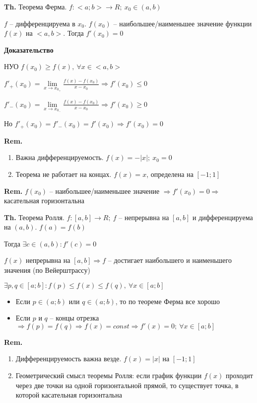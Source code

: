 \documentclass[14pt, letter paper]{article}
\begin{document}
\textbf{Th.} Теорема Ферма. $f : <a;b> \rightarrow R;\ x_0 \in (a, b)$

$f$ -- дифференцируема в $x_0$. $f(x_0)$ -- наибольшее/наименьшее значение функции $f(x)$ на $<a,b>$. Тогда $f'(x_0) = 0$

\begin{center}
    \textbf{Доказательство}
\end{center}

НУО $f(x_0) \geq f(x),\ \forall x \in <a, b>$

$f'_+(x_0) = \lim\limits_{x \rightarrow x_{0_+}} \frac{f(x) - f(x_0)}{x - x_0} \Rightarrow f'(x_0) \leq 0$

$f'_-(x_0) = \lim\limits_{x \rightarrow x_{0_-}} \frac{f(x) - f(x_0)}{x - x_0} \Rightarrow f'(x_0) \geq 0$

Но $f'_+(x_0) = f'_-(x_0) = f'(x_0) \Rightarrow f'(x_0) = 0$

\textbf{Rem.} 

\begin{enumerate}
    \item Важна дифференцируемость. $f(x) = -|x|;\ x_0 = 0$
    \item Теорема не работает на концах. $f(x) = x$, определена на $[-1; 1]$
\end{enumerate}

\textbf{Rem.} $f(x_0)$ -- наибольшее/наименьшее значение $\Rightarrow f'(x_0) = 0 \Rightarrow$ касательная горизонтальна

\vspace{5mm}

\textbf{Th.} Теорема Ролля. $f : [a, b] \rightarrow R;\ f$ -- непрерывна на $[a, b]$ и дифференцируема на $(a, b)$. $f(a) = f(b)$

Тогда $\exists c \in (a, b) : f'(c) = 0$

$f(x)$ непрерывна на $[a, b] \Rightarrow f$ -- достигает наибольшего и наименьшего значения (по Вейерштрассу)
    
$\exists p, q \in [a; b] : f(p) \leq f(x) \leq f(q),\ \forall x \in [a; b]$

\begin{itemize}
    \item Если $p \in (a; b)$ или $q \in (a;b)$, то по теореме Ферма все хорошо 
    \item Если $p$ и $q$ -- концы отрезка $\Rightarrow f(p) = f(q) \Rightarrow f(x) = const \Rightarrow f'(x) = 0;\ \forall x \in [a;b]$
\end{itemize}

\vspace{5mm}

\textbf{Rem.} \begin{enumerate}
    \item Дифференцируемость важна везде. $f(x) = |x|$ на $[-1; 1]$
    \item Геометрический смысл теоремы Ролля: если график функции $f(x)$ проходит через две точки на одной горизонтальной прямой, то существует точка, в которой касательная горизонтальна
\end{enumerate}
\end{document}
